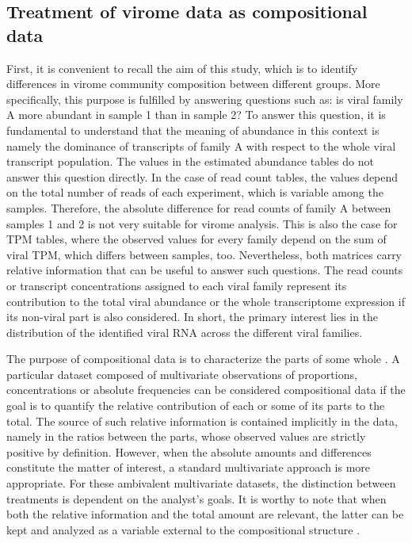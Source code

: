 \documentclass[
  openany]{book}
\begin{document}
\hypertarget{treatment-of-virome-data-as-compositional-data}{%
\subsection{Treatment of virome data as compositional data}\label{treatment-of-virome-data-as-compositional-data}}

First, it is convenient to recall the aim of this study, which is to identify differences in virome community composition between different groups. More specifically, this purpose is fulfilled by answering questions such as: is viral family A more abundant in sample 1 than in sample 2? To answer this question, it is fundamental to understand that the meaning of abundance in this context is namely the dominance of transcripts of family A with respect to the whole viral transcript population. The values in the estimated abundance tables do not answer this question directly. In the case of read count tables, the values depend on the total number of reads of each experiment, which is variable among the samples. Therefore, the absolute difference for read counts of family A between samples 1 and 2 is not very suitable for virome analysis. This is also the case for TPM tables, where the observed values for every family depend on the sum of viral TPM, which differs between samples, too. Nevertheless, both matrices carry relative information that can be useful to answer such questions. The read counts or transcript concentrations assigned to each viral family represent its contribution to the total viral abundance or the whole transcriptome expression if its non-viral part is also considered. In short, the primary interest lies in the distribution of the identified viral RNA across the different viral families.

The purpose of compositional data is to characterize the parts of some whole \autocite{Pawlowsky-Glahn2015a}. A particular dataset composed of multivariate observations of proportions, concentrations or absolute frequencies can be considered compositional data if the goal is to quantify the relative contribution of each or some of its parts to the total. The source of such relative information is contained implicitly in the data, namely in the ratios between the parts, whose observed values are strictly positive by definition. However, when the absolute amounts and differences constitute the matter of interest, a standard multivariate approach is more appropriate. For these ambivalent multivariate datasets, the distinction between treatments is dependent on the analyst's goals. It is worthy to note that when both the relative information and the total amount are relevant, the latter can be kept and analyzed as a variable external to the compositional structure \autocite{Pawlowsky-Glahn2015b}.
\end{document}
